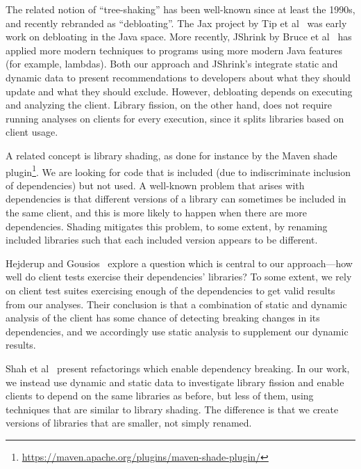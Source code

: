 The related notion of ``tree-shaking'' has been well-known since at least the 1990s, and recently rebranded as ``debloating''.
The Jax project by Tip et al~\cite{tip02:_pract_extrac_techn_java} was early work on debloating in the Java space.
More recently, JShrink by Bruce et al~\cite{bruce20:_jshrin} has applied more modern techniques to programs using more modern Java features (for example, lambdas).
Both our approach and JShrink's integrate static and dynamic data to present recommendations to developers about what they should update and what they should exclude.
However, debloating depends on executing and analyzing the client. Library fission, on the other hand, does not require running analyses on clients for every execution, since it splits libraries based on client usage.

A related concept is library shading, as done for instance by the Maven shade plugin\footnote{\url{https://maven.apache.org/plugins/maven-shade-plugin/}}. We are looking for code that is included (due to indiscriminate inclusion of dependencies) but not used. A well-known problem that arises with dependencies is that different versions of a library can sometimes be included in the same client, and this is more likely to happen when there are more dependencies. Shading mitigates this problem, to some extent, by renaming included libraries such that each included version appears to be different.

Hejderup and Gousios~\cite{DBLP:journals/jss/HejderupG22} explore a question which is central to our approach---how well do client tests exercise their dependencies' libraries? To some extent, we rely on client test suites exercising enough of the dependencies to get valid results from our analyses. Their conclusion is that a combination of static and dynamic analysis of the client has some chance of detecting breaking changes in its dependencies, and we accordingly use static analysis to supplement our dynamic results.



Shah et al~\cite{shah13:_autom_depen_break_refac_java} present refactorings which enable dependency breaking. In our work, we instead use dynamic and static data to investigate library fission and enable clients to depend on the same libraries as before, but less of them, using techniques that are similar to library shading. The difference is that we create versions of libraries that are smaller, not simply renamed.

